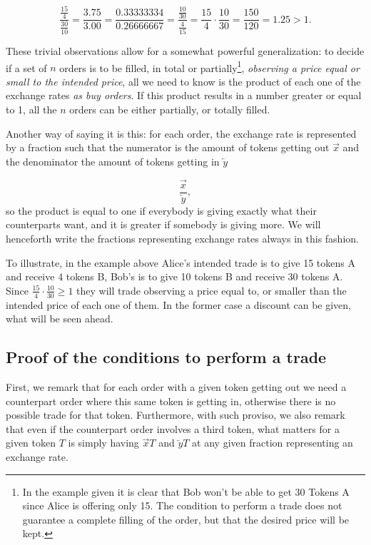 \documentclass{article}
\theoremstyle{remark}
\theoremstyle{definition}
\begin{document}
$$
\displaystyle\frac{\frac{15}{4}}{\frac{30}{10}}=\frac{3.75}{3.00}=\frac{0.33333334}{0.26666667}=\frac{\frac{10}{30}}{\frac{4}{15}}=\frac{15}{4}\cdot\frac{10}{30}=\frac{150}{120}=1.25>1.
$$

These trivial observations allow for a somewhat powerful generalization: to decide if a set of $n$ orders is to be filled, in total or partially\footnote{In the example given it is clear that Bob won't be able to get 30 Tokens A since Alice is offering only 15. The condition to perform a trade does not guarantee a complete filling of the order, but that the desired price will be kept.}, \emph{observing a price equal or small to the intended price}, all we need to know is the product of each one of the exchange rates \emph{as buy orders}. If this product results in a number greater or equal to 1, all the $n$ orders can be either partially, or totally filled.

Another way of saying it is this: for each order, the exchange rate is represented by a fraction such that the numerator is the amount of tokens getting out $\overrightarrow{x}$ and the denominator the amount of tokens getting in $\underleftarrow{y}$

$$\dfrac{\overrightarrow{x}}{\underleftarrow{y}},$$
%
so the product is equal to one if everybody is giving exactly what their counterparts want, and it is greater if somebody is giving more. We will henceforth write the fractions representing exchange rates always in this fashion.

To illustrate, in the example above Alice's intended trade is to give 15 tokens A and receive 4 tokens B, Bob's is to give 10 tokens B and receive 30 tokens A. Since $\frac{15}{4}\cdot\frac{10}{30}\geq 1$ they will trade observing a price equal to, or smaller than the intended price of each one of them. In the former case a discount can be given, what will be seen ahead.

\subsection{Proof of the conditions to perform a trade}\label{sect:subsect1}

First, we remark that for each order with a given token getting out we need a counterpart order where this same token is getting in, otherwise there is no possible trade for that token. Furthermore, with such proviso, we also remark that even if the counterpart order involves a third token, what matters for a given token $T$ is simply having $\overrightarrow{x}T$ and $\underleftarrow{y}T$ at any given fraction representing an exchange rate.
\end{document}
